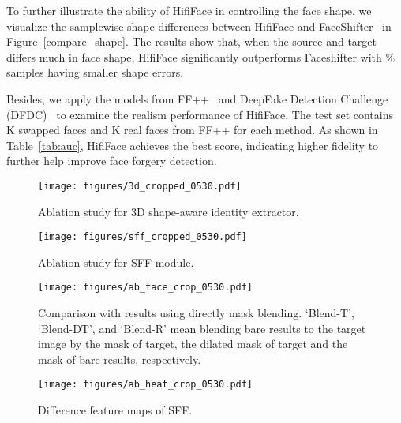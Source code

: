 \documentclass{article}
\begin{document}
To further illustrate the ability of HifiFace in controlling the face shape, we visualize the samplewise shape differences between HifiFace and FaceShifter~\cite{li2019faceshifter} in Figure~\ref{compare_shape}. 
The results show that, when the source and target differs much in face shape, HifiFace significantly outperforms Faceshifter with \% samples having smaller shape errors.





Besides, we apply the models from
FF++~\cite{rossler2019faceforensics++} and DeepFake Detection Challenge (DFDC)~\cite{dolhansky2019deepfake,dfdc} to examine the realism performance of HifiFace. 
The test set contains K swapped faces and K real faces from FF++ for each method. 
As shown in Table~\ref{tab:auc}, HifiFace achieves the best score, indicating higher fidelity to further help improve face forgery detection.




\begin{figure}[t] 
\begin{center} 
\texttt{[image: figures/3d\_cropped\_0530.pdf]} 
\end{center} 
\vspace{-2mm}
\caption{Ablation study for 3D shape-aware identity extractor.} 
\label{ab_3D}
\end{figure}

\begin{figure}[t] 
\begin{center} 
\texttt{[image: figures/sff\_cropped\_0530.pdf]} 
\end{center} 
\vspace{-2mm}
\caption{Ablation study for SFF module.} 
\label{ab_SFF} 
\end{figure}

\begin{figure}[t] 
\begin{center} 
\texttt{[image: figures/ab\_face\_crop\_0530.pdf]} 
\end{center} 
\vspace{-2mm}
\caption{Comparison with results using directly mask blending. `Blend-T', `Blend-DT', and `Blend-R' mean blending bare results to the target image by the mask of target, the dilated mask of target and the mask of bare results, respectively. } 
\label{ab_face} 
\end{figure}

\begin{figure}[t] 
\begin{center} 
\texttt{[image: figures/ab\_heat\_crop\_0530.pdf]} 
\end{center} 
\vspace{-2mm}
\caption{Difference feature maps of SFF.}\label{ab_heatmap} 
\end{figure}
\end{document}
